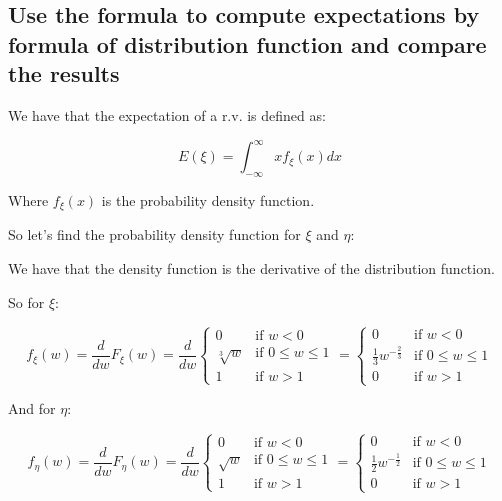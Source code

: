 \subsection*{Use the formula to compute expectations by formula of distribution function and compare the results}

We have that the expectation of a r.v. is defined as:

\begin{equation*}
    E(\xi) = \int_{-\infty}^{\infty} x f_\xi(x) dx
\end{equation*}

Where $f_\xi(x)$ is the probability density function.

So let's find the probability density function for $\xi$ and $\eta$:

We have that the density function is the derivative of the distribution function.

So for $\xi$:

\begin{equation*}
    f_\xi(w) = \frac{d}{dw} F_\xi(w) = \frac{d}{dw} \begin{cases}
        0           & \text{if } w < 0           \\
        \sqrt[3]{w} & \text{if } 0 \leq w \leq 1 \\
        1           & \text{if } w > 1
    \end{cases} = \begin{cases}
        0                            & \text{if } w < 0           \\
        \frac{1}{3} w^{-\frac{2}{3}} & \text{if } 0 \leq w \leq 1 \\
        0                            & \text{if } w > 1
    \end{cases}
\end{equation*}

And for $\eta$:

\begin{equation*}
    f_\eta(w) = \frac{d}{dw} F_\eta(w) = \frac{d}{dw} \begin{cases}
        0        & \text{if } w < 0           \\
        \sqrt{w} & \text{if } 0 \leq w \leq 1 \\
        1        & \text{if } w > 1
    \end{cases} = \begin{cases}
        0                            & \text{if } w < 0           \\
        \frac{1}{2} w^{-\frac{1}{2}} & \text{if } 0 \leq w \leq 1 \\
        0                            & \text{if } w > 1
    \end{cases}
\end{equation*}

